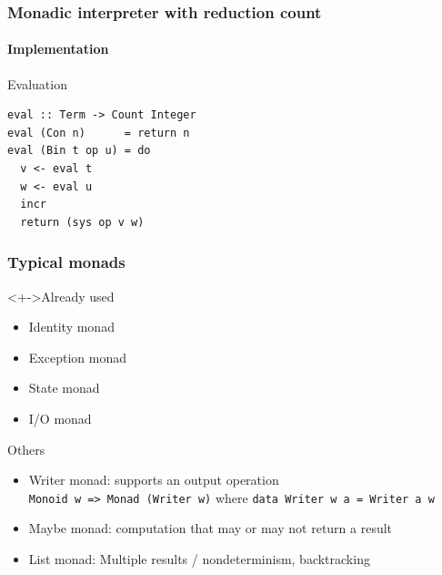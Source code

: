 \documentclass{beamer}
\begin{document}
\begin{frame}[fragile]
  \frametitle{Monadic interpreter with reduction count}
  \framesubtitle{Implementation}
\begin{exampleblock}{Evaluation}
\begin{lstlisting}
eval :: Term -> Count Integer
eval (Con n)      = return n
eval (Bin t op u) = do
  v <- eval t
  w <- eval u
  incr
  return (sys op v w)
\end{lstlisting} 
\end{exampleblock}
\end{frame}
\begin{frame}[fragile]
  \frametitle{Typical monads}
  \begin{block}<+->{Already used}
  \begin{itemize}       
  \item Identity monad
  \item Exception monad
  \item State monad
  \item I/O monad
  \end{itemize} 
\end{block}
\begin{block}{Others}
  \begin{itemize}
  \item Writer monad: supports an output operation\\
    \lstinline{Monoid w => Monad (Writer w)} where
    \lstinline{data Writer w a = Writer a w}
  \item Maybe monad: computation that may or may not return a result
  \item List monad: Multiple results / nondeterminism, backtracking
  \end{itemize}
\end{block}
\end{frame}
\end{document}
